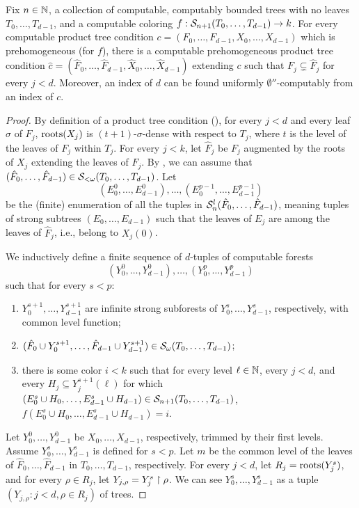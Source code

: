 \begin{lemma}\label{thm:milliken-prehomogeneous-one-step}
Fix $n \in \mathbb{N}$, a collection of computable, computably bounded trees with no leaves $T_0, \dots, T_{d-1}$, and a computable coloring $f: \mathcal{S}_{n+1}({T_0, \dots, T_{d-1}}) \to k$. For every computable product tree condition $c = (F_0, \dots, F_{d-1}, X_0, \dots,X_{d-1})$ which is prehomogeneous (for $f$), there is a computable prehomogeneous product tree condition
$\hat{c} = (\hat{F}_0, \dots, \hat{F}_{d-1}, \hat{X}_0, \dots, \hat{X}_{d-1})$ extending $c$
such that $F_j \subsetneq \hat{F}_j$ for every $j < d$. Moreover, an index of $d$ can be found uniformly $\emptyset''$-computably from an index of $c$.
\end{lemma}
\begin{proof}
By definition of a product tree condition (), for every $j < d$ and every leaf $\sigma$ of $F_j$,
$\operatorname{roots}(X_j)$ is $(t+1)$-$\sigma$-dense with respect to $T_j$, where $t$ is the level of the leaves of $F_j$ within $T_j$.
For every $j < k$, let $\hat{F}_j$ be $F_j$ augmented by the roots of $X_j$ extending the leaves of $F_j$. By , we can assume that $(\hat{F}_0, \dots, \hat{F}_{d-1}) \in \mathcal{S}_{<\omega}({T_0, \dots, T_{d-1}})$.  Let 
\[
( E^0_0, \dots, E^0_{d-1} ), \dots, ( E^{p-1}_0, \dots, E^{p-1}_{d-1} )
\]
be the (finite) enumeration of all the tuples in $\mathcal{S}^{l}_{n}({\hat{F}_0, \dots, \hat{F}_{d-1}})$, meaning tuples of strong subtrees $( E_0, \dots, E_{d-1} )$ such that the leaves of $E_j$ are among the leaves of $\hat{F}_j$, i.e., belong to $X_j(0)$.

We inductively define a finite sequence of $d$-tuples of computable forests
$$
( Y^0_0, \dots, Y^0_{d-1} ), \dots, ( Y^p_0, \dots, Y^p_{d-1} )
$$
such that for every $s < p$:
\begin{enumerate}
	\item $Y^{s+1}_0, \dots, Y^{s+1}_{d-1}$ are infinite strong subforests of $Y^s_0, \dots, Y^s_{d-1}$, respectively, with common level function;
	\item $(\hat{F}_0 \cup Y^{s+1}_0, \dots, \hat{F}_{d-1} \cup Y^{s+1}_{d-1}) \in \mathcal{S}_{\omega}({T_0, \dots, T_{d-1}})$;
	\item there is some color $i < k$ such that for every level $\ell \in \mathbb{N}$, every $j < d$, and every $H_j \subseteq Y^{s+1}_j(\ell)$ for which $( E^s_0 \cup H_0, \dots, E^s_{d-1} \cup H_{d-1} ) \in \mathcal{S}_{n+1}({T_0, \dots, T_{d-1}})$,
		$f( E^s_0 \cup H_0, \dots, E^s_{d-1} \cup H_{d-1} ) = i$.
\end{enumerate}
Let $Y^0_0, \dots, Y^0_{d-1}$ be $X_0, \dots, X_{d-1}$, respectively, trimmed by their first levels.
Assume $Y^s_0, \dots, Y^s_{d-1}$ is defined for $s < p$. Let $m$ be the common level of the leaves of $\hat{F}_0, \dots, \hat{F}_{d-1}$ in $T_0, \dots, T_{d-1}$, respectively. For every $j < d$, let $R_j = \operatorname{roots}(Y^s_j)$, and for every $\rho \in R_j$, let $Y_{j,\rho} = Y^s_j \upharpoonright \rho$.
We can see $Y^s_0, \dots, Y^s_{d-1}$ as a tuple $( Y_{j,\rho}: j < d, \rho \in R_j )$ of trees.


\end{proof}
